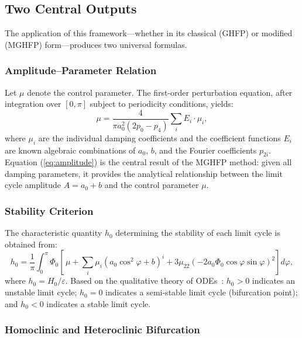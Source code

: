 \documentclass[11pt,a4paper]{article}
\begin{document}
\subsection{Two Central Outputs}

The application of this framework---whether in its classical (GHFP) or modified (MGHFP) form---produces two universal formulas.

\subsubsection{Amplitude--Parameter Relation}

Let $\mu$ denote the control parameter. The first-order perturbation equation, after integration over $[0, \pi]$ subject to periodicity conditions, yields:
\begin{equation}
\boxed{\mu = \frac{4}{\pi a_0^2(2p_0 - p_4)}\sum_i E_i \cdot \mu_i},
\label{eq:amplitude}
\end{equation}
where $\mu_i$ are the individual damping coefficients and the coefficient functions $E_i$ are known algebraic combinations of $a_0$, $b$, and the Fourier coefficients $p_{2i}$. Equation (\ref{eq:amplitude}) is the central result of the MGHFP method: given all damping parameters, it provides the analytical relationship between the limit cycle amplitude $A = a_0 + b$ and the control parameter $\mu$.

\subsubsection{Stability Criterion}

The characteristic quantity $h_0$ determining the stability of each limit cycle is obtained from:
\begin{equation}
h_0 = \frac{1}{\pi}\int_0^{\pi} \Phi_0\left[\,\mu + \sum_i \mu_i(a_0\cos^2\varphi + b)^i + 3\mu_{22}(-2a_0\Phi_0\cos\varphi\sin\varphi)^2\right] d\varphi,
\label{eq:stability}
\end{equation}
where $h_0 = H_0/\varepsilon$. Based on the qualitative theory of ODEs~\cite{Dumortier2006}: $h_0 > 0$ indicates an unstable limit cycle; $h_0 = 0$ indicates a semi-stable limit cycle (bifurcation point); and $h_0 < 0$ indicates a stable limit cycle.

\subsubsection{Homoclinic and Heteroclinic Bifurcation}
\end{document}
